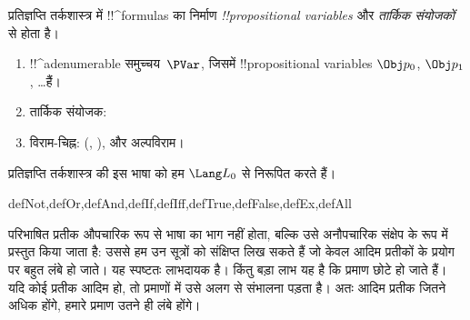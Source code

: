 \documentclass[../../../include/open-logic-section]{subfiles}
\begin{document}


प्रतिज्ञप्ति तर्कशास्त्र में !!^{formula}s का निर्माण \emph{!!{propositional
    variable}s} और \emph{तार्किक संयोजकों} से होता है।

\begin{enumerate}
\item !!^a{denumerable} समुच्चय~$\PVar$, जिसमें !!{propositional variable}s
  $\Obj p_0$, $\Obj p_1$, \dots हैं।
\item तार्किक संयोजक:
  \startycommalist
\item विराम-चिह्न: (, ), और अल्पविराम।
\end{enumerate}

प्रतिज्ञप्ति तर्कशास्त्र की इस भाषा को हम $\Lang L_0$ से निरूपित करते हैं।


\begin{tagblock}{defNot,defOr,defAnd,defIf,defIff,defTrue,defFalse,defEx,defAll}
\begin{explain}
परिभाषित प्रतीक औपचारिक रूप से भाषा का भाग नहीं होता, बल्कि उसे अनौपचारिक
संक्षेप के रूप में प्रस्तुत किया जाता है: उससे हम उन सूत्रों को संक्षिप्त लिख
सकते हैं जो केवल आदिम प्रतीकों के प्रयोग पर बहुत लंबे हो जाते। यह स्पष्टतः
लाभदायक है। किंतु बड़ा लाभ यह है कि प्रमाण छोटे हो जाते हैं। यदि कोई प्रतीक
आदिम हो, तो प्रमाणों में उसे अलग से संभालना पड़ता है। अतः आदिम प्रतीक जितने
अधिक होंगे, हमारे प्रमाण उतने ही लंबे होंगे।
\end{explain}
\end{tagblock}
\end{document}
